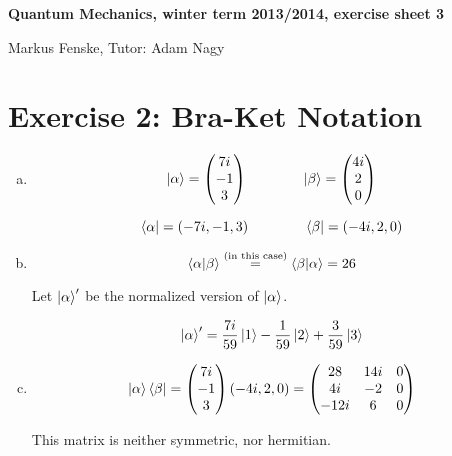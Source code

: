 \documentclass[a4paper,german,12pt,smallheadings]{scrartcl}
\begin{document}
\begin{center}
\bfseries %
\sffamily %
\vspace{-40pt}
Quantum Mechanics, winter term 2013/2014, exercise sheet 3

Markus Fenske, Tutor: Adam Nagy
\vspace{-10pt}
\end{center}

\section*{Exercise 2: Bra-Ket Notation}

\begin{enumerate}[a)]
  \item
    \begin{equation*}
      \ket{\alpha} = \begin{pmatrix} 7i \\ -1 \\ 3\end{pmatrix}
      \qquad\qquad
      \ket{\beta} = \begin{pmatrix} 4i \\ 2 \\ 0\end{pmatrix}
    \end{equation*}

    \begin{equation*}
      \bra{\alpha} = (-7i, -1, 3)
      \qquad
      \qquad
      \bra{\beta} = (-4i, 2, 0)
    \end{equation*}

  \item
    \begin{equation*}
      \braket{\alpha|\beta} \overset{\text{(in this case)}}{=} \braket{\beta|\alpha} = 26
    \end{equation*}

    Let $\ket{\alpha}'$ be the normalized version of $\ket{\alpha}$.

    \begin{equation*}
      \ket{\alpha}' = \frac{7i}{59}\ket{1} -\frac{1}{59}\ket{2} + \frac{3}{59}\ket{3}
    \end{equation*}

  \item
    \begin{equation*}
      \ket{\alpha}\bra{\beta} =
      \begin{pmatrix} 7i \\ -1 \\ 3 \end{pmatrix}
        (-4i, 2, 0)
        =
        \begin{pmatrix}
          28 & 14i & 0 \\
          4i & -2 & 0 \\
          -12i & 6 & 0
        \end{pmatrix}
    \end{equation*}

    This matrix is neither symmetric, nor hermitian.

\end{enumerate}
\end{document}
